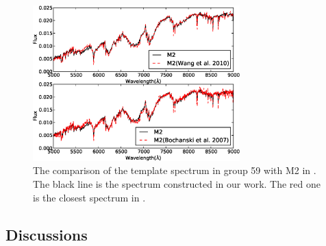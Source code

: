 \documentclass[referee]{raa}            %
\begin{document}
 \begin{figure}
   \centering
   \includegraphics[width=8cm, angle=0,clip]{f94.eps}
   \caption{The comparison of the template spectrum in group 59 with  M2 in \citet{bochanski2007low}.
The black line is the spectrum constructed in our work.
The red one is the closest spectrum in  \citet{bochanski2007low}.
   }
   \label{Fig94}
\end{figure}

%
%
%

\subsection{Discussions}
\end{document}
